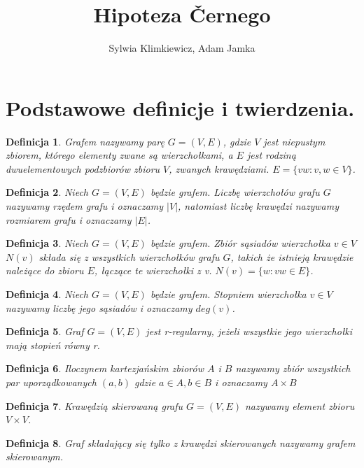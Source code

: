 \documentclass[12pt,a4paper]{article}
\newtheorem{df}{Definicja}[section]
\begin{document}
\title{Hipoteza \v Cernego}
\author{Sylwia Klimkiewicz, Adam Jamka}
\maketitle


\section{Podstawowe definicje i twierdzenia.}
\begin{df} 
Grafem nazywamy par\k{e} $G=(V,E)$, gdzie $V$ jest niepustym zbiorem, kt\'orego elementy zwane s\k{a} wierzcho{\l}kami, a $E$ jest rodzin\k{a} dwuelementowych podzbior\'ow zbioru $V$, zwanych kraw\k{e}dziami.
$E=\{vw : v,w\in V \}$.
\end{df}
\begin{df} 
Niech $G=(V,E)$ b\k{e}dzie grafem. Liczb\k{e} wierzcho{\l}\'ow grafu $G$ nazywamy rz\k{e}dem grafu i oznaczamy $|V|$, natomiast liczb\k{e} kraw\k{e}dzi nazywamy rozmiarem grafu i oznaczamy $|E|$.
\end{df}
\begin{df} 
Niech $G=(V,E)$ b\k{e}dzie grafem. Zbi\'or s\k{a}siad\'ow wierzcho{\l}ka $v\in V$ $N(v)$ sk{\l}ada si\k{e} z wszystkich wierzcho{\l}k\'ow grafu $G$, takich \.ze istniej\k{a} kraw\k{e}dzie nale\.z\k{a}ce do zbioru $E$, {\l}\k{a}cz\k{a}ce te wierzcho{\l}ki z v. $N(v)=\{w : vw\in E\}$.
\end{df} 
\begin{df} 
Niech $G=(V,E)$ b\k{e}dzie grafem. Stopniem wierzcho{\l}ka $v\in V$ nazywamy liczb\k{e} jego s\k{a}siad\'ow i oznaczamy $deg(v)$.
\end{df}
\begin{df} 
Graf $G=(V,E)$ jest r-regularny, je\.zeli wszystkie jego wierzcho{\l}ki maj\k{a} stopie\'n r\'owny r.
\end{df} 
\begin{df} 
Iloczynem kartezja\'nskim zbior\'ow $A$ i $B$ nazywamy zbi\'or wszystkich par uporz\k{a}dkowanych $(a,b)$ gdzie $a\in A, b\in B$ i oznaczamy $A\times B$ 
\end{df}
\begin{df} 
Kraw\k{e}dzi\k{a} skierowan\k{a} grafu $G=(V,E)$ nazywamy element zbioru $V\times V$.
\end{df}
\begin{df} 
Graf sk{\l}adaj\k{a}cy si\k{e} tylko z kraw\k{e}dzi skierowanych nazywamy grafem skierowanym.
\end{df}
\end{document}
